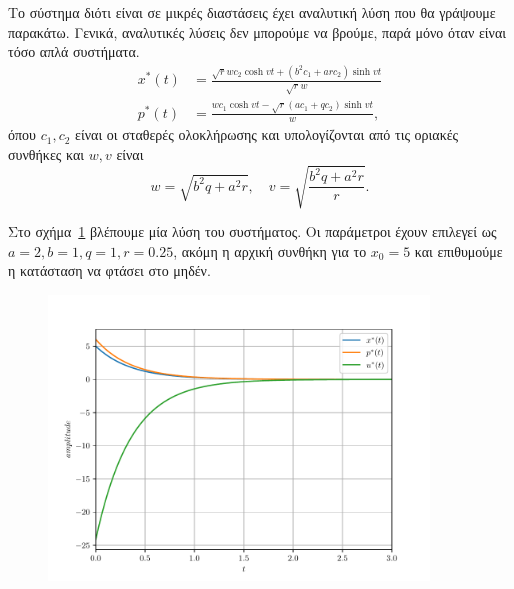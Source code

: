 \begin{solution}
    Το σύστημα διότι είναι σε μικρές διαστάσεις έχει αναλυτική λύση που θα
    γράψουμε παρακάτω. Γενικά, αναλυτικές λύσεις δεν μπορούμε να βρούμε, παρά
    μόνο όταν είναι τόσο απλά συστήματα.
    \begin{align*}
        x^*(t) &= \frac{
            \sqrt{r}wc_2\cosh{vt} + (b^2c_1 + arc_2)\sinh{vt}
        }{\sqrt{r}w} \\
        p^*(t) &= \frac{
            wc_1\cosh{vt} - \sqrt{r}(ac_1 + qc_2)\sinh{vt}
        }{w},
    \end{align*}
    όπου \( c_1, c_2 \) είναι οι σταθερές ολοκλήρωσης και υπολογίζονται από τις
    οριακές συνθήκες και \(w, v \) είναι
    \[
        w = \sqrt{b^2q + a^2r}, \quad v = \sqrt{\frac{b^2q + a^2r}{r}}.
    \]

    Στο σχήμα~\ref{fig:ex7_case1} βλέπουμε μία λύση του συστήματος. Οι
    παράμετροι έχουν επιλεγεί ως \( a = 2, b = 1, q = 1, r = 0.25 \), ακόμη η
    αρχική συνθήκη για το \( x_0 = 5 \) και επιθυμούμε η κατάσταση να φτάσει στο
    μηδέν.
    \begin{figure}[h]
        \centering
        \includegraphics[width=0.9\textwidth]{figures/ex7_case1.pdf}
        \caption{}
        \label{fig:ex7_case1}
    \end{figure}
\end{solution}

